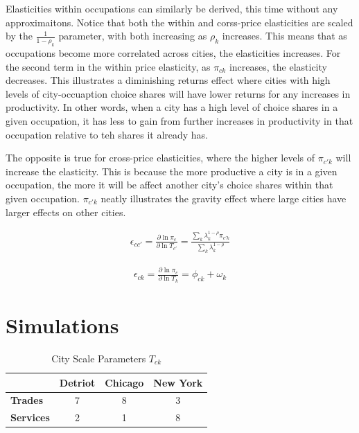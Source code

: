 \documentclass[10pt]{article}
\begin{document}
Elasticities within occupations can similarly be derived, this time without any approximaitons. Notice that both the within and corss-price elasticities are scaled by the $\frac{1}{1 - \rho_k}$ parameter, with both increasing as $\rho_k$ increases. This means that as occupations become more correlated across cities, the elasticities increases. For the second term in the within price elasticity, as $\pi_{ck}$ increases, the elasticity decreases. This illustrates a diminishing returns effect where cities with high levels of city-occuaption choice shares will have lower returns for any increases in productivity. In other words, when a city has a high level of choice shares in a given occupation, it has less to gain from further increases in productivity in that occupation relative to teh shares it already has.

The opposite is true for cross-price elasticities, where the higher levels of $\pi_{c'k}$ will increase the elasticity. This is because the more productive a city is in a given occupation, the more it will be affect another city's choice shares within that given occupation. $\pi_{c'k}$ neatly illustrates the gravity effect where large cities have larger effects on other cities.

\begin{align}
    \epsilon_{cc'} = \frac{\partial \ln \pi_c}{\partial \ln T_{c'}} = \frac{\sum_{k}^{} \lambda_k^{1 - \rho} \pi_{c'k}}{\sum_{k}^{} \lambda_k^{1 - \rho}}
\end{align}

\begin{align}
    \epsilon_{ck} = \frac{\partial \ln \pi_c}{\partial \ln T_k} = \phi_{ck} + \omega_k
\end{align}

\section{Simulations}

\begin{table}[h]
    \centering
    \begin{tabular}{|l|c|c|c|}
        \hline
                          & \textbf{Detriot} & \textbf{Chicago} & \textbf{New York} \\
        \hline
        \textbf{Trades}   & 7                & 8                & 3                 \\
        \hline
        \textbf{Services} & 2                & 1                & 8                 \\
        \hline
    \end{tabular}
    \caption{City Scale Parameters $T_{ck}$}
    \label{city_shifter}
\end{table}
\end{document}
